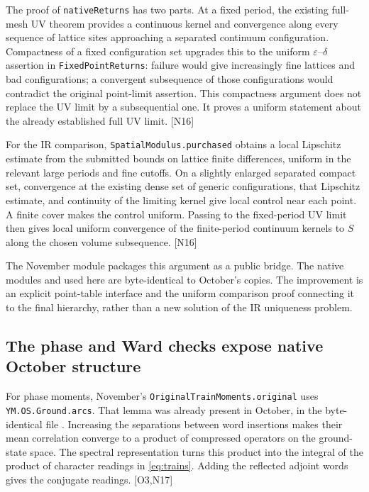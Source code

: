 \documentclass[11pt]{article}
\newcommand{\code}[1]{{\small\nolinkurl{#1}}}
\newcommand{\src}[1]{\textsf{[#1]}}
\begin{document}
The proof of \code{nativeReturns} has two parts. At a fixed period, the
existing full-mesh UV theorem provides a continuous kernel and convergence
along every sequence of lattice sites approaching a separated continuum
configuration. Compactness of a fixed configuration set upgrades this to
the uniform $\varepsilon$--$\delta$ assertion in \code{FixedPointReturns}:
failure would give increasingly fine lattices and bad configurations;
a convergent subsequence of those configurations would contradict the
original point-limit assertion. This compactness argument does not replace
the UV limit by a subsequential one. It proves a uniform statement about
the already established full UV limit. \src{N16}

For the IR comparison, \code{SpatialModulus.purchased} obtains a local
Lipschitz estimate from the submitted bounds on lattice finite differences,
uniform in the relevant large periods and fine cutoffs. On a slightly
enlarged separated compact set, convergence at the existing dense set of
generic configurations, that Lipschitz estimate, and continuity of the
limiting kernel give local control near each point. A finite cover makes
the control uniform. Passing to the fixed-period UV limit then gives
local uniform convergence of the finite-period continuum kernels to $S$
along the chosen volume subsequence. \src{N16}

The November module packages this argument as a public bridge. The native
modules  and
 used here are byte-identical to October's
copies. The improvement is an explicit point-table interface and the
uniform comparison proof connecting it to the final hierarchy, rather than
a new solution of the IR uniqueness problem.

\subsection{The phase and Ward checks expose native October structure}

For phase moments, November's \code{OriginalTrainMoments.original} uses
\code{YM.OS.Ground.arcs}. That lemma was already present in October, in
the byte-identical file . Increasing the
separations between word insertions makes their mean correlation converge
to a product of compressed operators on the ground-state space. The
spectral representation turns this product into the integral of the
product of character readings in \eqref{eq:trains}. Adding the reflected
adjoint words gives the conjugate readings. \src{O3,N17}
\end{document}
